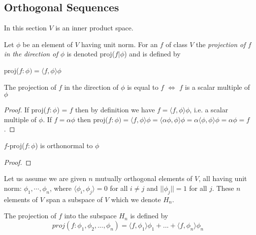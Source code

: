 \documentclass[conference,12pt,onecolumn,compsoc]{IEEEtran}
\begin{document}
\subsection{Orthogonal Sequences}
\label{section: Orthogonal Sequences}

In this section $V$ is an inner product space.

\begin{definition}
Let $\phi$ be an element of $V$  having unit norm. For an $f$ of class $V$ the \emph{projection of $f$ in the direction of $\phi$} is denoted proj($f|\phi$) and is defined by
\begin{center}
proj($f:\phi)=\langle f, \phi\rangle\phi$
\end{center}
\end{definition}

\begin{theorem}
The projection of $f$ in the direction of $\phi$ is equal to $f$ $\Leftrightarrow$ $f$ is a scalar multiple of $\phi$
\end{theorem}
\begin{proof}
If proj($f:\phi$) = $f$ then by definition we have $f=\langle f, \phi\rangle\phi$, i.e. a scalar multiple of $\phi$. If $f=\alpha \phi$ then proj($f:\phi)=\langle f, \phi\rangle\phi = \langle \alpha \phi, \phi\rangle\phi  = \alpha \langle \phi, \phi\rangle\phi = \alpha\phi = f$. 
\end{proof}

\begin{theorem}
$f$-proj($f:\phi$) is orthonormal to $\phi$
\end{theorem}
\begin{proof}

\end{proof}

Let us assume we are given $n$ mutually orthogonal elements of $V$, all having unit norm: $\phi_1, \cdots, \phi_n$, where $\langle \phi_i, \phi_j\rangle = 0$ for all $i\neq j$ and $||\phi_j|| = 1$ for all $j$. These $n$ elements of $V$ span a subspace of $V$ which we denote $H_n$. 

\begin{definition}
The projection of $f$ into the subspace $H_n$ is defined by
\begin{equation}
proj(f:\phi_1, \phi_2, ..., \phi_n) = \langle f, \phi_1\rangle \phi_1+ ... + \langle f, \phi_n\rangle \phi_n
\label{subspace projection}
\end{equation}
\end{definition}
\end{document}
